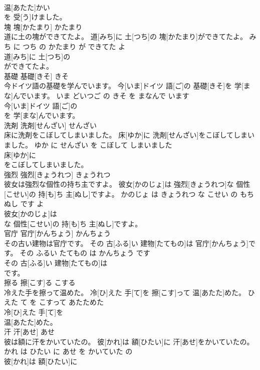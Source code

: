 \documentclass[8pt]{extreport}
\begin{document}
\begin{CJK}{UTF8}{min}
\\	温[あたた]かい
\\	を 受[う]けました。			
\\	塊	塊[かたまり]	かたまり	
\\	道に土の塊ができてたよ。	道[みち]に 土[つち]の 塊[かたまり]ができてたよ。	みち に つち の かたまり が できてた よ	
\\	道[みち]に 土[つち]の
\\	ができてたよ。			
\\	基礎	基礎[きそ]	きそ	
\\	今ドイツ語の基礎を学んでいます。	今[いま]ドイツ 語[ご]の 基礎[きそ]を 学[まな]んでいます。	いま どいつご の きそ を まなんで います	
\\	今[いま]ドイツ 語[ご]の
\\	を 学[まな]んでいます。			
\\	洗剤	洗剤[せんざい]	せんざい	
\\	床に洗剤をこぼしてしまいました。	床[ゆか]に 洗剤[せんざい]をこぼしてしまいました。	ゆか に せんざい を こぼして しまいました	
\\	床[ゆか]に
\\	をこぼしてしまいました。			
\\	強烈	強烈[きょうれつ]	きょうれつ	
\\	彼女は強烈な個性の持ち主ですよ。	彼女[かのじょ]は 強烈[きょうれつ]な 個性[こせい]の 持[も]ち 主[ぬし]ですよ。	かのじょ は きょうれつ な こせい の もちぬし です よ	
\\	彼女[かのじょ]は
\\	な 個性[こせい]の 持[も]ち 主[ぬし]ですよ。			
\\	官庁	官庁[かんちょう]	かんちょう	
\\	その古い建物は官庁です。	その 古[ふる]い 建物[たてもの]は 官庁[かんちょう]です。	その ふるい たてもの は かんちょう です	
\\	その 古[ふる]い 建物[たてもの]は
\\	です。			
\\	擦る	擦[こす]る	こする	
\\	冷えた手を擦って温めた。	冷[ひ]えた 手[て]を 擦[こす]って 温[あたた]めた。	ひえた て を こすって あたためた	
\\	冷[ひ]えた 手[て]を
\\	温[あたた]めた。			
\\	汗	汗[あせ]	あせ	
\\	彼は額に汗をかいていたの。	彼[かれ]は 額[ひたい]に 汗[あせ]をかいていたの。	かれ は ひたい に あせ を かいていた の	
\\	彼[かれ]は 額[ひたい]に

\end{CJK}
\end{document}
